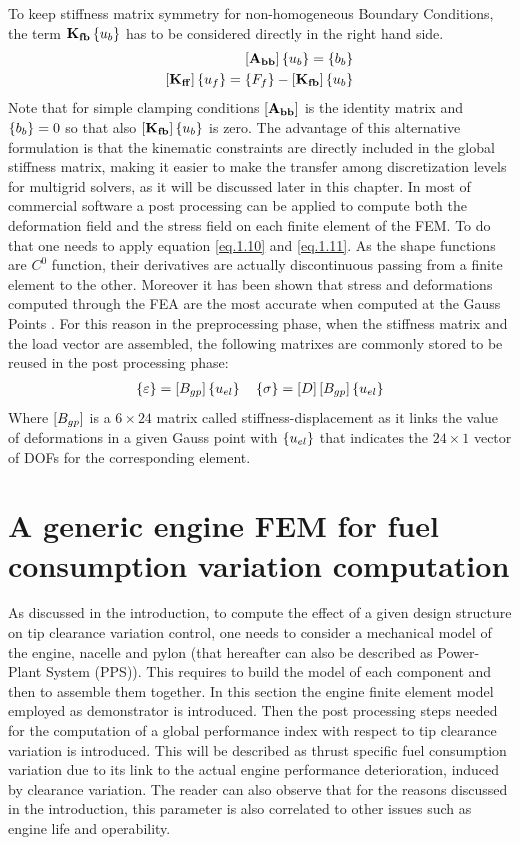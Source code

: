 To keep stiffness matrix symmetry for non-homogeneous Boundary Conditions, the term  $\mathbf{K_{fb}}\left\lbrace{u_b}\right \rbrace$ has to be considered directly in the right hand side.
\begin{eqnarray}
\label{eq.1.17s}
\left[{\mathbf{A_{bb}}}\right]\left\lbrace{u_b}\right \rbrace=\left\lbrace{b_b}\right \rbrace\\
\label{eq.1.18s}
\left[{\mathbf{K_{ff}}}\right]\left\lbrace{u_f}\right \rbrace=\left\lbrace{F_f}\right \rbrace-\left[{\mathbf{K_{fb}}}\right]\left\lbrace{u_b}\right \rbrace
\end{eqnarray}
Note that for simple clamping conditions $\left[{\mathbf{A_{bb}}}\right]$ is the identity matrix and $\left\lbrace{b_b}\right \rbrace=0$  so that also $\left[{\mathbf{K_{fb}}}\right]\left\lbrace{u_b}\right \rbrace$ is zero.
The advantage of this alternative formulation is that the kinematic constraints are directly included in the global stiffness matrix, making it easier to make the transfer among discretization levels for multigrid solvers, as it will be discussed later in this chapter.
In most of commercial software a post processing can be applied to compute both the deformation field and the stress field on each finite element of the FEM. To do that one needs to apply equation \eqref{eq.1.10} and \eqref{eq.1.11}. As the shape functions are $C^0$ function, their derivatives are actually discontinuous passing from a finite element to the other. Moreover it has been shown that stress and deformations computed through the FEA are the most accurate when computed at the Gauss Points \cite{zlamal1978superconvergence,zhang2006natural}. For this reason in the preprocessing phase, when the stiffness matrix and the load vector are assembled, the following matrixes are commonly stored to be reused in the post processing phase:
\begin{eqnarray}
\label{eq.1.40}
	\left\lbrace{\varepsilon}\right \rbrace=\left[{B_{gp}}\right]\left\lbrace{u_{el}}\right \rbrace \quad
	\left\lbrace{\sigma}\right \rbrace=\left[{D}\right]\left[{B_{gp}}\right]\left\lbrace{u_{el}}\right \rbrace
\end{eqnarray}
Where $\left[{B_{gp}}\right]$ is a $6\times 24$ matrix called stiffness-displacement as it links the value of deformations in a given Gauss point with $\left\lbrace{u_{el}}\right \rbrace$ that indicates the $24\times1$ vector of DOFs for the corresponding element.
\section{A generic engine FEM for fuel consumption variation computation}
As discussed in the introduction, to compute the effect of a given design structure on tip clearance variation control, one needs to consider a mechanical model of the engine, nacelle and pylon (that hereafter can also be described as Power-Plant System (PPS)). This requires to build the model of each component and then to assemble them together.
In this section the engine finite element model employed as demonstrator is introduced. Then the post processing steps needed for the computation of a global performance index with respect to tip clearance variation is introduced. This will be described as thrust specific fuel consumption variation due to its link to the actual engine performance deterioration, induced by clearance variation. The reader can also observe that for the reasons discussed in the introduction, this parameter is also correlated to other issues such as engine life and operability.
